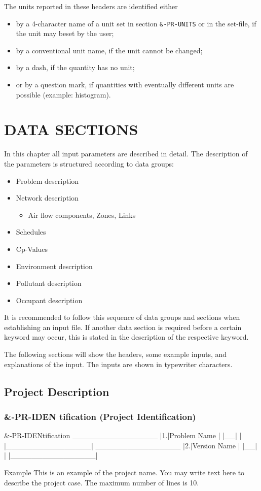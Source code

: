 \documentclass[10pt]{book}
\begin{document}
The units reported in these headers are identified either
\begin{itemize}
\item by a 4-character name of a unit set in section \verb|&-PR-UNITS| or in the set-file, if the unit may beset by the user;
\item by a conventional unit name, if the unit cannot be changed;
\item by a dash, if the quantity has no unit;
\item or by a question mark, if quantities with eventually different units are possible (example: histogram).
\end{itemize}

\chapter{DATA SECTIONS}

In this chapter all input parameters are described in detail. The description of the parameters is structured according to data groups: 
\begin{itemize}
\item Problem description 
\item Network description 
\begin{itemize}
\item Air flow components, Zones, Links 
\end{itemize}
\item Schedules 
\item Cp-Values 
\item Environment description 
\item Pollutant description 
\item Occupant description 
\end{itemize}

It is recommended to follow this sequence of data groups and sections when establishing an input file. If another data section is required before a certain keyword may occur, this is stated in the description of the respective keyword. 

The following sections will show the headers, some example inputs, and explanations of the input. The inputs are shown in typewriter characters. 

\section{Project Description}
\subsection{\&-PR-IDEN tification (Project Identification)}
\begin{inputfile}
&-PR-IDENtification
  ________________ 
 |1.|Problem Name |
 |__|             |
 |________________|
  ________________ 
 |2.|Version Name |
 |__|             |
 |________________|
\end{inputfile}
Example This is an example of the project name. 
You may write text here to describe the project case. 
The maximum number of lines is 10. 
\end{document}

